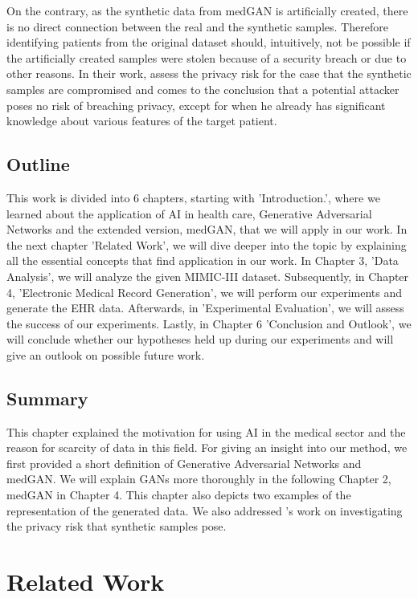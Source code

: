 \documentclass[11pt, a4paper, oneside]{book}
\begin{document}
On the contrary, as the synthetic data from medGAN is artificially created, there is no direct connection between the real and the synthetic samples. Therefore identifying patients from the original dataset should, intuitively, not be possible if the artificially created samples were stolen because of a security breach or due to other reasons. In their work, \citep{Choi2017} assess the privacy risk for the case that the synthetic samples are compromised and comes to the conclusion that a potential attacker poses no risk of breaching privacy, except for when he already has significant knowledge about various features of the target patient.

\section{Outline}
This work is divided into 6 chapters, starting with 'Introduction.', where we learned about the application of AI in health care, Generative Adversarial Networks and the extended version, medGAN, that we will apply in our work. In the next chapter 'Related Work', we will dive deeper into the topic by explaining all the essential concepts that find application in our work. In Chapter 3,  'Data Analysis', we will analyze the given MIMIC-III dataset. Subsequently, in Chapter 4, 'Electronic Medical Record Generation', we will perform our experiments and generate the EHR data. Afterwards, in 'Experimental Evaluation', we will assess the success of our experiments. Lastly, in Chapter 6 'Conclusion and Outlook', we will conclude whether our hypotheses held up during our experiments and will give an outlook on possible future work.

\section{Summary}
This chapter explained the motivation for using AI in the medical sector and the reason for scarcity of data in this field. For giving an insight into our method, we first provided a short definition of Generative Adversarial Networks and medGAN. We will explain GANs more thoroughly in the following Chapter 2, medGAN in Chapter 4. This chapter also depicts two examples of the representation of the generated data. We also addressed \citep{Choi2017}'s work on investigating the privacy risk that synthetic samples pose.

\chapter{Related Work}
\end{document}
